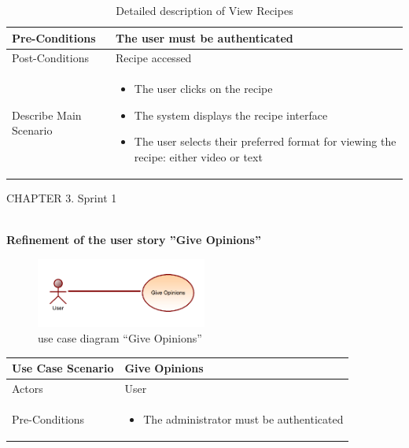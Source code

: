 \documentclass{article}
\begin{document}
{{{{\begin{table}[h]
\begin{tabularx}{\textwidth}{X|X}
        \midrule
        Pre-Conditions &  The user must be authenticated \\
        \midrule
        Post-Conditions & Recipe accessed  \\
        \midrule
        Describe Main Scenario &  
        \begin{itemize}[label=$\bullet$]
            \item The user clicks on the recipe
            \item The system displays the recipe interface
            \item The user selects their preferred format for viewing the recipe: either video or text 
        \end{itemize} \\
        \bottomrule
    \end{tabularx}
    \caption{Detailed description of View Recipes}
    \label{tab:actors_roles}
\end{table}




\newpage
\noindent
CHAPTER 3.  Sprint 1 \\
\underline{\hspace{\textwidth}} \vspace{0.2cm}\\
{\large \textbf{Refinement of the user story ”Give Opinions”}
\begin{figure}[htbp]
    \centering
    \includegraphics[width=0.5\textwidth]{opin}
    \caption{use case diagram “Give Opinions”}
    \label{fig:design2}
\end{figure}
\begin{table}[h]
    \centering
    \begin{tabularx}{\textwidth}{X|X}
        \toprule
        Use Case Scenario & Give Opinions \\
        \midrule
        Actors & User \\
        \midrule
        Pre-Conditions & \begin{itemize}[label=$\bullet$]
            \item The administrator must be authenticated
           

\end{itemize}
\end{tabularx}
\end{table}}}}}}
\end{document}
